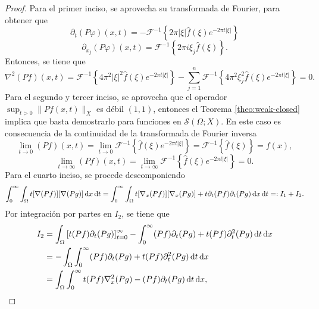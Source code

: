 \begin{proof}
	Para el primer inciso, se aprovecha su transformada de Fourier, para obtener que 
		\begin{equation*}
		\partial_t (P\varphi)(x, t) = - \mathcal{F}^{-1}\left\{2\pi|\xi| \widehat{f}(\xi) e^{-2\pi t |\xi|}  \right\}
	\end{equation*}
	\begin{equation*}
		\partial_{x_j} (P\varphi)(x, t) = \mathcal{F}^{-1}\left\{2\pi i\xi_j\widehat{f}(\xi)  \right\}.
	\end{equation*}
	Entonces, se tiene que 
	\begin{equation*}
		\nabla^2(Pf)(x, t) = \mathcal{F}^{-1}\left\{4\pi^2|\xi|^2 \widehat{f}(\xi) e^{-2\pi t |\xi|} \right\}- \sum_{j=1}^n 
		 \mathcal{F}^{-1}\left\{4\pi^2 \xi_j^2\widehat{f}(\xi) e^{-2\pi t |\xi|}\right\}
		 = 0.
	\end{equation*}
	Para el segundo y tercer inciso, se aprovecha que el operador $\sup_{t>0}\|Pf(x, t)\|_X$ es débil $(1, 1)$, entonces el Teorema \ref{theo:weak-closed} implica que basta demostrarlo para funciones en $\mathcal{S}(\Omega;X)$. En este caso es consecuencia de la continuidad de la transformada de Fourier inversa
	\begin{equation*}
		\lim_{t\to0} (Pf)(x, t) = \lim_{t\to0} \mathcal{F}^{-1}\left\{\widehat{f}(\xi) e^{-2\pi t |\xi|}\right\} = \mathcal{F}^{-1}\left\{\widehat{f}(\xi) \right\}  = f(x),
	\end{equation*}
	\begin{equation*}
		\lim_{t\to\infty} (Pf)(x, t) = \lim_{t\to\infty} \mathcal{F}^{-1}\left\{\widehat{f}(\xi) e^{-2\pi t |\xi|}\right\} =0.
	\end{equation*}
	Para el cuarto inciso, se procede descomponiendo
	\begin{equation*}
		 \int_0^\infty\int_{\Omega} t[\nabla(Pf)][\nabla(Pg)]\mathop{}\!\mathrm{d} x \mathop{}\!\mathrm{d} t = \int_0^\infty\int_{\Omega} t[\nabla_x(Pf)][\nabla_x(Pg)] + t\partial_t(Pf)\partial_t(Pg)\mathop{}\!\mathrm{d} x \mathop{}\!\mathrm{d} t =: I_1+I_2.
	\end{equation*}
	Por integración por partes en $I_2$, se tiene que
	\begin{align*}
		I_2& = \int_{\Omega} \left[ t(Pf)\partial_t(Pg) 
		\right]_{t=0}^\infty - \int_0^\infty (Pf)\partial_t(Pg) + t(Pf)\partial^2_t(Pg)\diff t \diff x \\  
		& =- \int_{\Omega}  \int_0^\infty (Pf)\partial_t(Pg) + t(Pf)\partial^2_t(Pg)\diff t \diff x\\
		&= \int_{\Omega}  \int_0^\infty   t(Pf)\nabla^2_x(Pg)-(Pf)\partial_t(Pg)\diff t \diff x,

\end{align*}
\end{proof}
